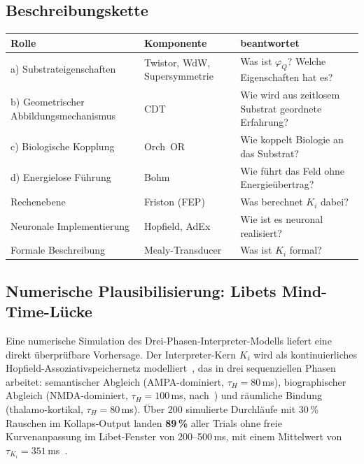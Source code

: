 \documentclass[11pt,a4paper]{article}
\begin{document}
\subsection*{Beschreibungskette}

\medskip
\begin{center}\small
\begin{tabular}{@{}lll@{}}
\toprule
Rolle & Komponente & beantwortet \\
\midrule
a) Substrateigenschaften   & Twistor, WdW, Supersymmetrie & Was ist $\varphi_Q$? Welche Eigenschaften hat es? \\
b) Geometrischer Abbildungsmechanismus & CDT           & Wie wird aus zeitlosem Substrat geordnete Erfahrung? \\
c) Biologische Kopplung    & Orch~OR                      & Wie koppelt Biologie an das Substrat? \\
d) Energielose Führung     & Bohm                         & Wie führt das Feld ohne Energieübertrag? \\
\midrule
Rechenebene                & Friston (FEP)                & Was berechnet $K_i$ dabei? \\
Neuronale Implementierung  & Hopfield, AdEx               & Wie ist es neuronal realisiert? \\
Formale Beschreibung       & Mealy-Transducer             & Was ist $K_i$ formal? \\
\bottomrule
\end{tabular}
\end{center}
\medskip

\subsection*{Numerische Plausibilisierung: Libets Mind-Time-Lücke}

Eine numerische Simulation des Drei-Phasen-Interpreter-Modells liefert eine
direkt überprüfbare Vorhersage. Der Interpreter-Kern $K_i$ wird als
kontinuierliches Hopfield-Assoziativspeichernetz modelliert~\citep{hopfield1982},
das in drei sequenziellen Phasen arbeitet: semantischer Abgleich
(AMPA-dominiert, $\tau_H = 80\,$ms), biographischer Abgleich
(NMDA-dominiert, $\tau_H = 100\,$ms, nach~\citep{jahrsteVens1990}) und
räumliche Bindung (thalamo-kortikal, $\tau_H = 80\,$ms). Über 200 simulierte
Durchläufe mit 30\,\% Rauschen im Kollaps-Output landen \textbf{89\,\%}
aller Trials ohne freie Kurvenanpassung im Libet-Fenster von 200–500\,ms,
mit einem Mittelwert von $\tau_{K_i} = 351\,$ms~\citep{libet2004}.
\end{document}
